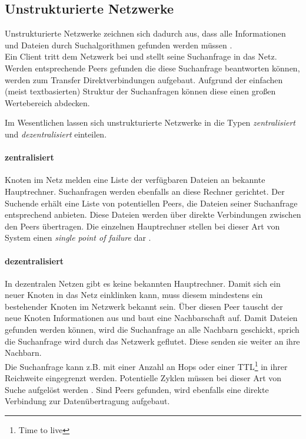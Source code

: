 \subsection{Unstrukturierte Netzwerke}
Unstrukturierte Netzwerke zeichnen sich dadurch aus, dass alle Informationen und Dateien durch Suchalgorithmen gefunden werden müssen \cite{Lv2002}. \\
Ein Client tritt dem Netzwerk bei und stellt seine Suchanfrage in das Netz. Werden entsprechende Peers gefunden die diese Suchanfrage beantworten können, werden zum Transfer Direktverbindungen aufgebaut. Aufgrund der einfachen (meist textbasierten) Struktur der Suchanfragen können diese einen großen Wertebereich abdecken.

Im Wesentlichen lassen sich unstrukturierte Netzwerke in die Typen \emph{zentralisiert} und \emph{dezentralisiert} einteilen.

\paragraph{zentralisiert} Knoten im Netz melden eine Liste der verfügbaren Dateien an bekannte Hauptrechner. Suchanfragen werden ebenfalls an diese Rechner gerichtet. Der Suchende erhält eine Liste von potentiellen Peers, die Dateien seiner Suchanfrage entsprechend anbieten. Diese Dateien werden über direkte Verbindungen zwischen den Peers übertragen. Die einzelnen Hauptrechner stellen bei dieser Art von System einen \emph{single point of failure} dar \cite{Eberspaecher2005}.

\paragraph{dezentralisiert} In dezentralen Netzen gibt es keine bekannten Hauptrechner. Damit sich ein neuer Knoten in das Netz einklinken kann, muss diesem mindestens ein bestehender Knoten im Netzwerk bekannt sein. Über diesen Peer tauscht der neue Knoten Informationen aus und baut eine Nachbarschaft auf. Damit Dateien gefunden werden können, wird die Suchanfrage an alle Nachbarn geschickt, sprich die Suchanfrage wird durch das Netzwerk geflutet. Diese senden sie weiter an ihre Nachbarn.\\
Die Suchanfrage kann z.B. mit einer Anzahl an Hops oder einer TTL\footnote{Time to live} in ihrer Reichweite eingegrenzt werden. Potentielle Zyklen müssen bei dieser Art von Suche aufgelöst werden \cite{Lv2002}. Sind Peers gefunden, wird ebenfalls eine direkte Verbindung zur Datenübertragung aufgebaut. 

